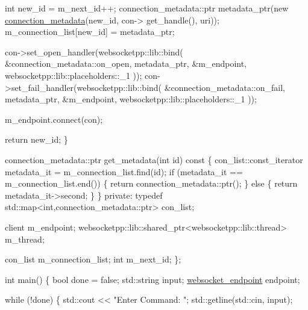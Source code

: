 \begin{DoxyCode}
        \textcolor{keywordtype}{int} new\_id = m\_next\_id++;
        connection\_metadata::ptr metadata\_ptr(\textcolor{keyword}{new} \hyperlink{classconnection__metadata}{connection\_metadata}(new\_id, con->
      get\_handle(), uri));
        m\_connection\_list[new\_id] = metadata\_ptr;

        con->set\_open\_handler(websocketpp::lib::bind(
            &connection\_metadata::on\_open,
            metadata\_ptr,
            &m\_endpoint,
            websocketpp::lib::placeholders::\_1
        ));
        con->set\_fail\_handler(websocketpp::lib::bind(
            &connection\_metadata::on\_fail,
            metadata\_ptr,
            &m\_endpoint,
            websocketpp::lib::placeholders::\_1
        ));

        m\_endpoint.connect(con);

        \textcolor{keywordflow}{return} new\_id;
    \}

    connection\_metadata::ptr get\_metadata(\textcolor{keywordtype}{int} \textcolor{keywordtype}{id})\textcolor{keyword}{ const }\{
        con\_list::const\_iterator metadata\_it = m\_connection\_list.find(\textcolor{keywordtype}{id});
        \textcolor{keywordflow}{if} (metadata\_it == m\_connection\_list.end()) \{
            \textcolor{keywordflow}{return} connection\_metadata::ptr();
        \} \textcolor{keywordflow}{else} \{
            \textcolor{keywordflow}{return} metadata\_it->second;
        \}
    \}
\textcolor{keyword}{private}:
    \textcolor{keyword}{typedef} std::map<int,connection\_metadata::ptr> con\_list;

    client m\_endpoint;
    websocketpp::lib::shared\_ptr<websocketpp::lib::thread> m\_thread;

    con\_list m\_connection\_list;
    \textcolor{keywordtype}{int} m\_next\_id;
\};

\textcolor{keywordtype}{int} main() \{
    \textcolor{keywordtype}{bool} done = \textcolor{keyword}{false};
    std::string input;
    \hyperlink{classwebsocket__endpoint}{websocket\_endpoint} endpoint;

    \textcolor{keywordflow}{while} (!done) \{
        std::cout << \textcolor{stringliteral}{"Enter Command: "};
        std::getline(std::cin, input);


\end{DoxyCode}
